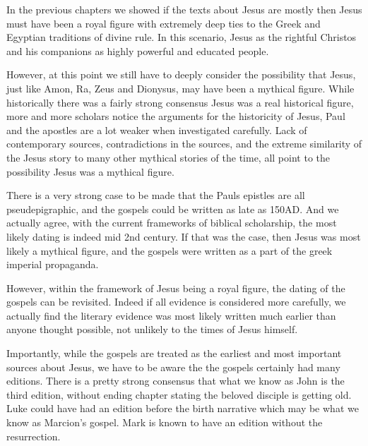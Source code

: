 In the previous chapters we showed if the texts about Jesus are mostly then Jesus must have been a royal figure with extremely deep ties to the Greek and Egyptian traditions of divine rule.
In this scenario, Jesus as the rightful Christos and his companions as highly powerful and educated people.

However, at this point we still have to deeply consider the possibility that Jesus, just like Amon, Ra, Zeus and Dionysus, may have been a mythical figure.
While historically there was a fairly strong consensus Jesus was a real historical figure, more and more scholars notice the arguments for the historicity of Jesus, Paul and the apostles are a lot weaker when investigated carefully.
Lack of contemporary sources, contradictions in the sources, and the extreme similarity of the Jesus story to many other mythical stories of the time, all point to the possibility Jesus was a mythical figure.

There is a very strong case to be made that the Pauls epistles are all pseudepigraphic, and the gospels could be written as late as 150AD.
And we actually agree, with the current frameworks of biblical scholarship, the most likely dating is indeed mid 2nd century.
If that was the case, then Jesus was most likely a mythical figure, and the gospels were written as a part of the greek imperial propaganda.

However, within the framework of Jesus being a royal figure, the dating of the gospels can be revisited.
Indeed if all evidence is considered more carefully, we actually find the literary evidence was most likely written much earlier than anyone thought possible, not unlikely to the times of Jesus himself.

Importantly, while the gospels are treated as the earliest and most important sources about Jesus, we have to be aware the the gospels certainly had many editions.
There is a pretty strong consensus that what we know as John is the third edition, without ending chapter stating the beloved disciple is getting old.
Luke could have had an edition before the birth narrative which may be what we know as Marcion's gospel.
Mark is known to have an edition without the resurrection.

